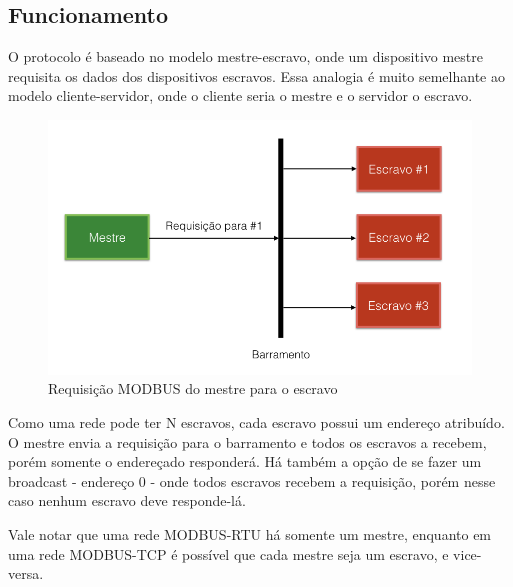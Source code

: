 \subsection{Funcionamento}

O protocolo é baseado no modelo mestre-escravo, onde um dispositivo mestre requisita os dados dos dispositivos escravos. Essa analogia é muito semelhante ao modelo cliente-servidor, onde o cliente seria o mestre e o servidor o escravo.

\begin{figure}[H]
        \begin{center}
                \includegraphics[width=\textwidth,natwidth=1024,natheight=768]{assets/images/modbus-req-1.png}
                \caption{Requisição MODBUS do mestre para o escravo}
                \label{fig:modbus-req-1}
        \end{center}
\end{figure}

Como uma rede pode ter N escravos, cada escravo possui um endereço atribuído. O mestre envia a requisição para o barramento e todos os escravos a recebem, porém somente o endereçado responderá. Há também a opção de se fazer um broadcast - endereço 0 - onde todos escravos recebem a requisição, porém nesse caso nenhum escravo deve responde-lá.

Vale notar que uma rede MODBUS-RTU há somente um mestre, enquanto em uma rede MODBUS-TCP é possível que cada mestre seja um escravo, e vice-versa.

